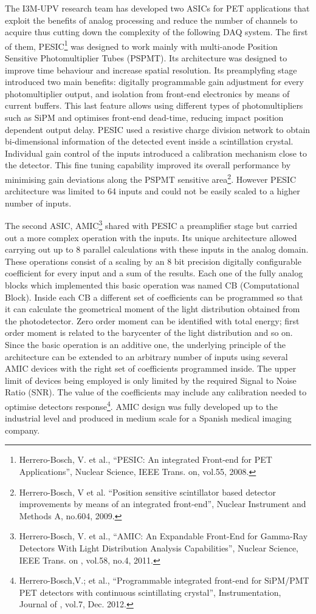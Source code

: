 The I3M-UPV research team has developed two ASICs for PET applications that
exploit the benefits of analog processing and reduce the number of channels
to acquire thus cutting down the complexity of the following DAQ system. 
The first of them, PESIC\footnote{Herrero-Bosch, V. et al., 
``PESIC: An integrated Front-end for PET
Applications'', Nuclear Science, IEEE Trans. on, vol.55, 2008.} was designed to work mainly with multi-anode
Position Sensitive Photomultiplier Tubes (PSPMT). Its architecture was
designed to improve time behaviour and increase spatial resolution. Its
preamplyfing stage introduced two main benefits: digitally programmable gain
adjustment for every photomultiplier output, and isolation from front-end
electronics by means of current buffers. This last feature allows using
different types of photomultipliers such as SiPM and optimises front-end
dead-time, reducing impact position dependent output delay. PESIC used a
resistive charge division network to obtain bi-dimensional information of the
detected event inside a scintillation crystal.  Individual gain control of
the inputs introduced a calibration mechanism close to the detector. This
fine tuning capability improved its overall performance by minimising gain
deviations along the PSPMT sensitive area\footnote{Herrero-Bosch, V et al. ``Position sensitive scintillator based detector
improvements by means of an integrated front-end'', Nuclear Instrument and Methods
A, no.604, 2009.}. However PESIC architecture
was limited to 64 inputs and could not be easily scaled to a higher number
of inputs.

The second ASIC, AMIC\footnote{Herrero-Bosch, V. et al., ``AMIC: An Expandable Front-End for Gamma-Ray
Detectors With Light Distribution Analysis Capabilities'', Nuclear Science,
IEEE Trans. on , vol.58, no.4, 2011.} shared with PESIC a preamplifier stage but carried
out a more complex operation with the inputs. Its unique architecture
allowed carrying out up to 8 parallel calculations with these inputs in the
analog domain. These operations consist of a scaling by an 8 bit precision
digitally configurable coefficient for every input and a sum of the results.
Each one of the fully analog blocks which implemented this basic operation
was named CB (Computational Block). Inside each CB a different set of
coefficients can be programmed so that it can calculate the geometrical
moment of the light distribution obtained from the photodetector. Zero order
moment can be identified with total energy; first order moment is related to
the barycenter of the light distribution and so on. Since the basic
operation is an additive one, the underlying principle of the architecture
can be extended to an arbitrary number of inputs using several AMIC devices
with the right set of coefficients programmed inside. The upper limit of
devices being employed is only limited by the required Signal to Noise Ratio
(SNR). The value of the coefficients may include any calibration needed to
optimise detectors response\footnote{Herrero-Bosch,V.; et al., ``Programmable integrated front-end for
SiPM/PMT PET detectors with continuous scintillating crystal'',
Instrumentation, Journal of , vol.7, Dec. 2012.}. AMIC design was fully developed up to the
industrial level and produced in medium scale for a Spanish medical imaging
company.

